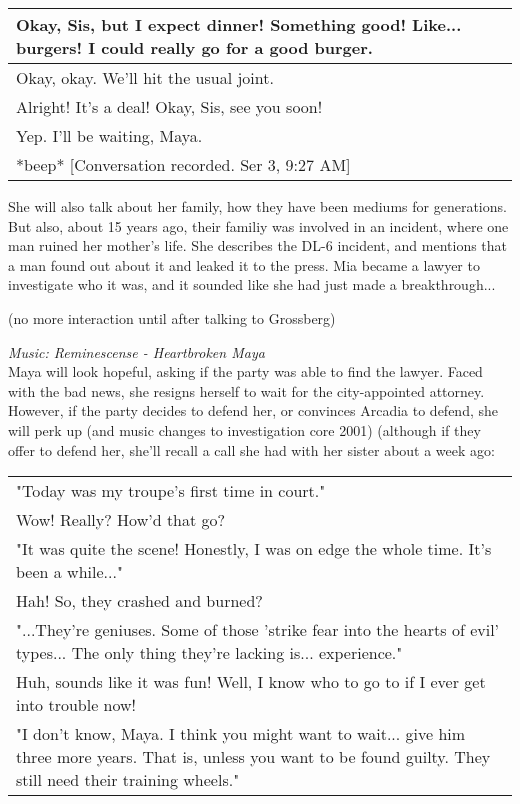 \begin{itemize}
\begin{tabular}{p{11cm}}
Okay, Sis, but I expect dinner! Something good! Like... burgers! I could really go for a good burger.\\\hline

Okay, okay. We'll hit the usual joint.\\\hline

Alright! It's a deal! Okay, Sis, see you soon!\\\hline

Yep. I'll be waiting, Maya.\\\hline

*beep* [Conversation recorded. Ser 3, 9:27 AM] 
\end{tabular}
\newpage
She will also talk about her family, how they have been mediums for generations. But also, about 15 years ago, their familiy was involved in an incident, where one man ruined her mother's life. She describes the DL-6 incident, and mentions that a man found out about it and leaked it to the press. Mia became a lawyer to investigate who it was, and it sounded like she had just made a breakthrough...

(no more interaction until after talking to Grossberg)

\textit{Music: Reminescense - Heartbroken Maya}\\
Maya will look hopeful, asking if the party was able to find the lawyer. Faced with the bad news, she resigns herself to wait for the city-appointed attorney. However, if the party decides to defend her, or convinces Arcadia to defend, she will perk up (and music changes to investigation core 2001)  (although if they offer to defend her, she'll recall a call she had with her sister about a week ago: \\
\begin{tabular}{p{11cm}}
"Today was my troupe's first time in court."\\
Wow! Really? How'd that go?\\
"It was quite the scene! Honestly, I was on edge the whole time. It's been a while..."\\
Hah! So, they crashed and burned?\\
"...They're geniuses. Some of those 'strike fear into the hearts of evil' types... The only thing they're lacking is... experience."\\
Huh, sounds like it was fun! Well, I know who to go to if I ever get into trouble now!\\
"I don't know, Maya. I think you might want to wait... give him three more years. That is, unless you want to be found guilty. They still need their training wheels." \\
\end{tabular}




\end{itemize}

